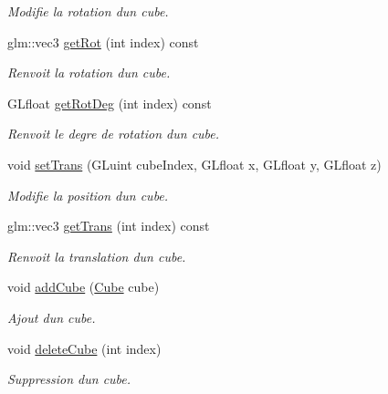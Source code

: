 \begin{DoxyCompactItemize}
\begin{DoxyCompactList}\small\item\em Modifie la rotation d\textquotesingle{}un cube. \end{DoxyCompactList}\item 
glm\+::vec3 \hyperlink{classglimac_1_1CubeList_a539399f61db27107ad39520c790467c0}{get\+Rot} (int index) const
\begin{DoxyCompactList}\small\item\em Renvoit la rotation d\textquotesingle{}un cube. \end{DoxyCompactList}\item 
G\+Lfloat \hyperlink{classglimac_1_1CubeList_a93d0947a863b9ebef7fb7903917b42af}{get\+Rot\+Deg} (int index) const
\begin{DoxyCompactList}\small\item\em Renvoit le degre de rotation d\textquotesingle{}un cube. \end{DoxyCompactList}\item 
void \hyperlink{classglimac_1_1CubeList_aa0c7fddc0f17997c0ed50010575ee19c}{set\+Trans} (G\+Luint cube\+Index, G\+Lfloat x, G\+Lfloat y, G\+Lfloat z)
\begin{DoxyCompactList}\small\item\em Modifie la position d\textquotesingle{}un cube. \end{DoxyCompactList}\item 
glm\+::vec3 \hyperlink{classglimac_1_1CubeList_a33c4eac5107d29b79941ddf0d790fa38}{get\+Trans} (int index) const
\begin{DoxyCompactList}\small\item\em Renvoit la translation d\textquotesingle{}un cube. \end{DoxyCompactList}\item 
void \hyperlink{classglimac_1_1CubeList_adaa2b032e1ee67cd7dc9feaab94edc6d}{add\+Cube} (\hyperlink{classglimac_1_1Cube}{Cube} cube)
\begin{DoxyCompactList}\small\item\em Ajout d\textquotesingle{}un cube. \end{DoxyCompactList}\item 
void \hyperlink{classglimac_1_1CubeList_ac8ffe918d3ff2788edd5c5bbfba45135}{delete\+Cube} (int index)
\begin{DoxyCompactList}\small\item\em Suppression d\textquotesingle{}un cube. \end{DoxyCompactList}\item 

\end{DoxyCompactItemize}
